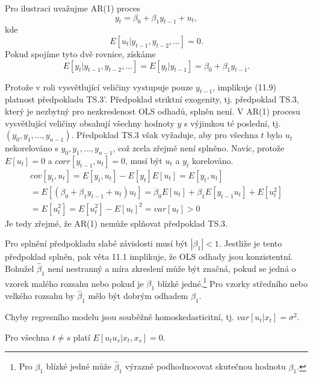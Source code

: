 Pro ilustraci uvažujme AR(1) proces
\begin{equation}
y_t = \beta_0 + \beta_1 y_{t - 1} + u_t,
\end{equation}
kde
\begin{equation}
E[u_t | y_{t - 1}, y_{t - 2}, ...] = 0.
\end{equation}
Pokud spojíme tyto dvě rovnice, získáme
\begin{equation}
E[y_t | y_{t - 1}, y_{t - 2}, ...] = E[y_t | y_{t - 1}] = \beta_0 + \beta_1 y_{t - 1}.
\end{equation}

Protože v roli vysvětlující veličiny vystupuje pouze $y_{t-1}$, implikuje (11.9) platnost předpokladu TS.3'. Předpoklad striktní exogenity, tj. předpoklad TS.3, který je nezbytný pro nezkreslenost OLS odhadů, splněn není. V AR(1) procesu vysvětlující veličiny obsahují všechny hodnoty $y$ s výjimkou té poslední, tj. $(y_0, y_1, ..., y_{n - 1})$. Předpoklad TS.3 však vyžaduje, aby pro všechna $t$ bylo $u_t$ nekorelováno s $y_0, y_1, ..., y_{n - 1}$, což zcela zřejmě není splněno. Navíc, protože $E[u_t] = 0$ a $corr[y_{t - 1}, u_t] = 0$, musí být $u_t$ a $y_t$ korelováno.
\begin{multline}
cov[y_t, u_t] = E[y_t, u_t] - E[y_t]E[u_t] = E[y_t, u_t]\\
= E[(\beta_0 + \beta_1 y_{t - 1} + u_t)u_t] = \beta_0 E[u_t] + \beta_1 E[y_{t - 1} u_t] + E[u^2_t]\\
= E[u^2_t] = E[u^2_t] - E[u_t]^2 = var[u_t] > 0  
\end{multline}
Je tedy zřejmé, že AR(1) nemůže splňovat předpoklad TS.3.

Pro splnění předpokladu slabé závislosti musí být $|\beta_1| < 1$. Jestliže je tento předpoklad splněn, pak věta 11.1 implikuje, že OLS odhady jsou konzistentní. Bohužel $\hat{\beta}_1$ není nestranný a míra zkreslení může být značná, pokud se jedná o vzorek malého rozsahu nebo pokud je $\beta_1$ blízké jedné.\footnote{Pro $\beta_1$ blízké jedné může $\hat{\beta}_1$ výrazně podhodnocovat skutečnou hodnotu $\beta_1$.} Pro vzorky středního nebo velkého rozsahu by $\hat{\beta}_1$ mělo být dobrým odhadem $\beta_1$.

\begin{assumption}[TS.4' - homoskedasticita]
Chyby regresního modelu jsou souběžně homoskedasticitní, tj. $var[u_t | x_t] = \sigma^2$.

\raggedleft{$\clubsuit$}
\end{assumption}

\begin{assumption}
Pro všechna $t \ne s$ platí $E[u_tu_s|x_t, x_s] = 0$.

\raggedleft{$\clubsuit$}
\end{assumption}

